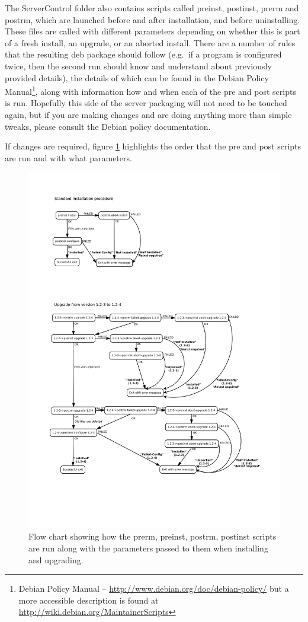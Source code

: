 The ServerControl folder also contains scripts called preinst, postinst, prerm and postrm, which are launched before and after installation, and before uninstalling.  These files are called with different parameters depending on whether this is part of a fresh install, an upgrade, or an aborted install.  There are a number of rules that the resulting deb package should follow (e.g.\ if a program is configured twice, then the second run should know and understand about previously provided details), the details of which can be found in the Debian Policy Manual\footnote{Debian Policy Manual -- \url{http://www.debian.org/doc/debian-policy/} but a more accessible description is found at \url{http://wiki.debian.org/MaintainerScripts}}, along with information how and when each of the pre and post scripts is run.  Hopefully this side of the server packaging will not need to be touched again, but if you are making changes and are doing anything more than simple tweaks, please consult the Debian policy documentation.

If changes are required, figure \ref{fig:debflowchart} highlights the order that the pre and post scripts are run and with what parameters.  


\begin{figure}[p]
  \centering
  \includegraphics[width=\textwidth]{Images/install-and-upgrade-procedure.pdf}
  \caption{Flow chart showing how the prerm, preinst, postrm, postinst scripts are run along with the parameters passed to them when installing and upgrading.  }
  \label{fig:debflowchart}
\end{figure}

